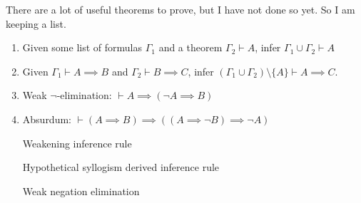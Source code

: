 \begin{node}\label{node:fs0:derived.nw:toc:propositional-logic}
There are a lot of useful theorems to prove, but I have not done so
yet. So I am keeping a list.
\begin{enumerate}\setcounter{enumi}{\value{node}}
\item Given some list of formulas $\Gamma_{1}$ and a theorem
  $\Gamma_{2}\vdash A$, infer $\Gamma_{1}\cup\Gamma_{2}\vdash A$
\item Given $\Gamma_{1}\vdash A\implies B$ and $\Gamma_{2}\vdash B\implies C$,
infer $(\Gamma_{1}\cup\Gamma_{2})\setminus\{A\}\vdash A\implies C$.
\item {} Weak $\neg$-elimination: $\vdash A\implies(\neg A\implies B)$
\item {} Absurdum: $\vdash(A\implies B)\implies((A\implies\neg B)\implies\neg A)$

\nwenddocs{}\endmoddef\nwstartdeflinemarkup{}\nwenddeflinemarkup
\LA{}Weakening inference rule~{\nwtagstyle{}}\RA{}

\LA{}Hypothetical syllogism derived inference rule~{\nwtagstyle{}}\RA{}

\LA{}Weak negation elimination~{\nwtagstyle{}}\RA{}


\end{enumerate}
\end{node}
